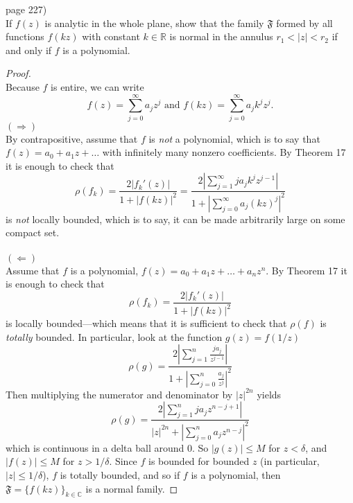 \documentclass{article}
\newenvironment{problem}[2][Problem]{\begin{trivlist}
\item[\hskip \labelsep {\bfseries #1}\hskip \labelsep {\bfseries #2.}]}{\end{trivlist}}
\begin{document}
\begin{problem}{3} (page 227) \\
  If $f(z)$ is analytic in the whole plane, show that the family $\mathfrak{F}$
  formed by all
  functions $f(kz)$ with constant $k \in \mathbb{R}$ is normal in the annulus $r_1 < |z| < r_2$
  if and only if $f$ is a polynomial.
\end{problem}
\begin{proof} \text{} \\
  Because $f$ is entire, we can write \[
    f(z) = \sum_{j=0}^\infty a_j z^j \text{ and }
    f(kz) = \sum_{j=0}^\infty a_j k^j z^j.
  \]
  $(\mathbf{\Longrightarrow})$\\
  By contrapositive, assume that $f$ is \textit{not} a polynomial, which is to
  say that $f(z) = a_0 + a_1z + \hdots$ with infinitely many nonzero coefficients.
  By Theorem 17 it is enough to check that \[
    \rho(f_k)
      = \frac{2|f_k'(z)|}{1 + |f(kz)|^2}
      = \frac{
          \displaystyle2\left|\sum_{j=1}^\infty ja_jk^jz^{j-1}\right|
        }{
          \displaystyle1 + \left|\sum_{j=0}^\infty a_j(kz)^j\right|^2
        }
  \] is \textit{not} locally bounded, which is to say, it can be made
  arbitrarily large on some compact set.
  \\~\\
  $(\mathbf{\Longleftarrow})$\\
  Assume that $f$ is a polynomial, $f(z) = a_0 + a_1z + \hdots + a_nz^n$.
  By Theorem 17 it is enough to check that \[
  \rho(f_k)
    = \frac{2|f_k'(z)|}{1 + |f(kz)|^2}
  \] is locally bounded---which means that it is sufficient to check that
  $\rho(f)$ is \textit{totally} bounded.
  In particular, look at the function $g(z) = f(1/z)$ \[
    \rho(g)
    = \frac{
      \displaystyle2\left|\sum_{j=1}^n \frac{ja_j}{z^{j-1}}\right|
    }{
      \displaystyle1 + \left|\sum_{j=0}^n \frac{a_j}{z^j}\right|^2
    }
  \]
  Then multiplying the numerator and denominator by $|z|^{2n}$ yields \[
    \rho(g)
    = \frac{
      \displaystyle2\left|\sum_{j=1}^n ja_jz^{n-j+1}\right|
    }{
      \displaystyle |z|^{2n} + \left|\sum_{j=0}^n a_j z^{n-j}\right|^2
    }
  \] which is continuous in a delta ball around $0$. So $|g(z)| \leq M$ for
  $z < \delta$, and $|f(z)| \leq M$ for $z > 1/\delta$. Since $f$ is bounded
  for bounded $z$ (in particular, $|z| \leq 1/\delta$), $f$ is totally bounded,
  and so if $f$ is a polynomial, then $\mathfrak{F} = \{f(kz)\}_{k \in \mathbb{C}}$ is a normal
  family.

\end{proof}
\pagebreak
\end{document}
